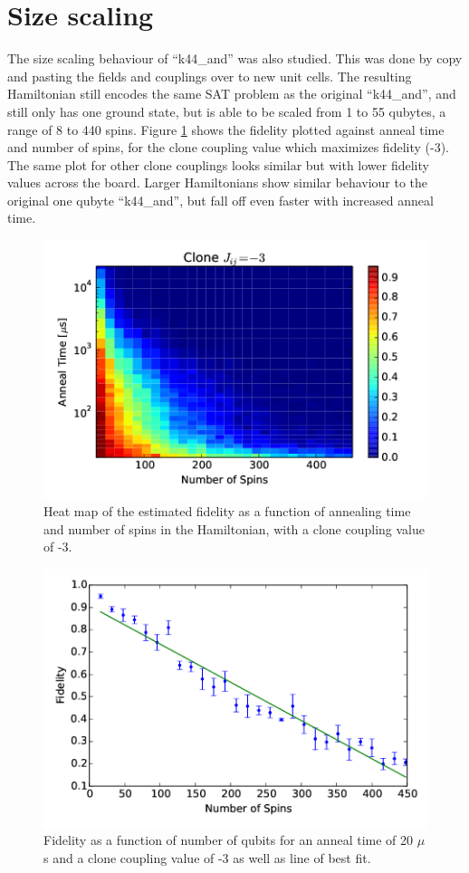 \section{Size scaling}
The size scaling behaviour of ``k44\_and'' was also studied.  This was done by copy and pasting the fields and couplings over to new unit cells.  The resulting Hamiltonian still encodes the same SAT problem as the original ``k44\_and'', and still only has one ground state, but is able to be scaled from 1 to 55 qubytes, a range of 8 to 440 spins.  Figure \ref{fig:time_spins} shows the fidelity plotted against anneal time and number of spins, for the clone coupling value which maximizes fidelity (-3).  The same plot for other clone couplings looks similar but with lower fidelity values across the board.  Larger Hamiltonians show similar behaviour to the original one qubyte ``k44\_and'', but fall off even faster with increased anneal time.

\begin{figure}
	\includegraphics{img/pcolor_c_3.png}
	\caption[Fidelity vs Time vs Number of Qubits]{Heat map of the estimated fidelity as a function of annealing time and number of spins in the Hamiltonian, with a clone coupling value of -3.}
	\label{fig:time_spins}
\end{figure}

\begin{figure}
	\includegraphics{img/trend.png}
	\caption[Fidelity vs Number of Qubits]{Fidelity as a function of number of qubits for an anneal time of 20 $\mu$s and a clone coupling value of -3 as well as line of best fit.}
	\label{fig:trend}
\end{figure}

